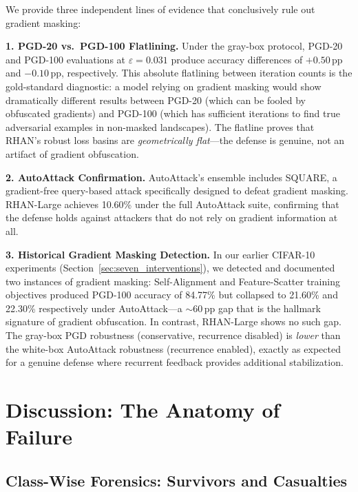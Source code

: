 \documentclass[12pt,a4paper]{article}
\begin{document}
We provide three independent lines of evidence that conclusively rule out
gradient masking:

\textbf{1. PGD-20 vs.\ PGD-100 Flatlining.}
Under the gray-box protocol, PGD-20 and PGD-100 evaluations at
$\varepsilon{=}0.031$ produce accuracy differences of $+0.50$\,pp and
$-0.10$\,pp, respectively. This absolute flatlining between iteration counts
is the gold-standard diagnostic: a model relying on gradient masking would
show dramatically different results between PGD-20 (which can be fooled by
obfuscated gradients) and PGD-100 (which has sufficient iterations to find
true adversarial examples in non-masked landscapes). The flatline proves that
RHAN's robust loss basins are \textit{geometrically flat}---the defense is
genuine, not an artifact of gradient obfuscation.

\textbf{2. AutoAttack Confirmation.}
AutoAttack's ensemble includes SQUARE, a gradient-free query-based attack
specifically designed to defeat gradient masking. RHAN-Large achieves 10.60\%
under the full AutoAttack suite, confirming that the defense holds against
attackers that do not rely on gradient information at all.

\textbf{3. Historical Gradient Masking Detection.}
In our earlier CIFAR-10 experiments (Section~\ref{sec:seven_interventions}),
we detected and documented two instances of gradient masking: Self-Alignment
and Feature-Scatter training objectives produced PGD-100 accuracy of 84.77\%
but collapsed to 21.60\% and 22.30\% respectively under AutoAttack---a
$\sim$60\,pp gap that is the hallmark signature of gradient obfuscation. In
contrast, RHAN-Large shows no such gap. The gray-box PGD robustness
(conservative, recurrence disabled) is \textit{lower} than the white-box
AutoAttack robustness (recurrence enabled), exactly as expected for a genuine
defense where recurrent feedback provides additional stabilization.


\section{Discussion: The Anatomy of Failure}
\label{sec:anatomy}

\subsection{Class-Wise Forensics: Survivors and Casualties}
\end{document}
